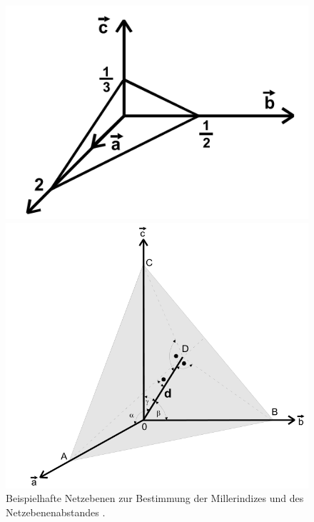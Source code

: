 \begin{figure}[h]
	\begin{minipage}[t]{0.45\textwidth}
		\includegraphics[width=\textwidth]{Abbildungen/miller}
	\end{minipage}
	\begin{minipage}[t]{0.45\textwidth}
		\includegraphics[width=\textwidth]{Abbildungen/netzebene}
	\end{minipage}
	\caption{Beispielhafte Netzebenen zur Bestimmung der Millerindizes und des Netzebenenabstandes \cite{Anleitung}. }
	\label{fig:miller}
\end{figure}

